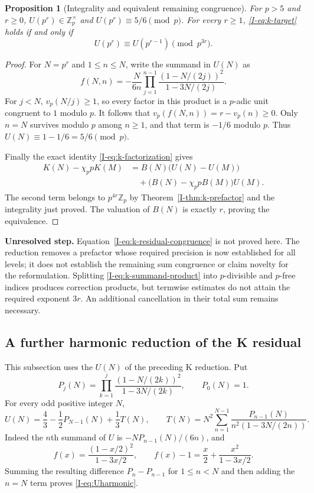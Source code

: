 \documentclass[11pt,letterpaper]{article}
\newtheorem{proposition}[theorem]{Proposition}
\numberwithin{equation}{section}
\begin{document}
\begin{proposition}[Integrality and equivalent remaining congruence]
\label{I-prop:k-equivalence}
For $p>5$ and $r\ge0$, $U(p^r)\in\mathbb Z_p^\times$ and
$U(p^r)\equiv5/6\pmod p$. For every $r\ge1$, \eqref{I-eq:k-target}
holds if and only if
\begin{equation}\label{I-eq:k-residual-congruence}
 \boxed{\quad U(p^r)\equiv U(p^{r-1})\pmod{p^{3r}}.\quad}
\end{equation}
\end{proposition}
\begin{proof}
For $N=p^r$ and $1\le n\le N$, write the summand in $U(N)$ as
\begin{equation}\label{I-eq:k-summand-product}
 f(N,n)=-\frac{N}{6n}
 \prod_{j=1}^{n-1}
 \frac{(1-N/(2j))^2}{1-3N/(2j)}.
\end{equation}
For $j<N$, $v_p(N/j)\ge1$, so every factor in this product is a
$p$-adic unit congruent to $1$ modulo $p$. It follows that
$v_p(f(N,n))=r-v_p(n)\ge0$. Only $n=N$ survives modulo $p$ among
$n\ge1$, and that term is $-1/6$ modulo $p$. Thus
$U(N)\equiv1-1/6=5/6\pmod p$.

Finally the exact identity \eqref{I-eq:k-factorization} gives
\begin{align*}
 K(N)-\chi_p pK(M)
 &=B(N)\bigl(U(N)-U(M)\bigr)\\
 &\quad+\bigl(B(N)-\chi_p pB(M)\bigr)U(M).
\end{align*}
The second term belongs to $p^{4r}\mathbb Z_p$ by
Theorem~\ref{I-thm:k-prefactor} and the integrality just proved.
The valuation of $B(N)$ is exactly $r$, proving the equivalence.
\end{proof}

\noindent\textbf{Unresolved step.}
Equation~\eqref{I-eq:k-residual-congruence} is not proved here. The reduction removes a prefactor whose required precision is now established for all levels; it does not establish the remaining sum congruence or claim novelty for the reformulation. Splitting \eqref{I-eq:k-summand-product} into $p$-divisible and $p$-free indices produces correction products, but termwise estimates do not attain the required exponent $3r$. An additional cancellation in their total sum remains necessary.
\subsection{A further harmonic reduction of the K residual}
This subsection uses the $U(N)$ of the preceding K reduction. Put
\[
 P_j(N)=\prod_{k=1}^j\frac{(1-N/(2k))^2}{1-3N/(2k)},\qquad P_0(N)=1.
\]
For every odd positive integer $N$,
\begin{equation}\label{I-eq:Uharmonic}
 U(N)=\frac43-\frac12P_{N-1}(N)+\frac13T(N),\qquad
 T(N)=N^2\sum_{n=1}^{N-1}\frac{P_{n-1}(N)}{n^2(1-3N/(2n))}.
\end{equation}
Indeed the $n$th summand of $U$ is $-NP_{n-1}(N)/(6n)$, and
\[
 f(x)=\frac{(1-x/2)^2}{1-3x/2},\qquad
 f(x)-1=\frac{x}{2}+\frac{x^2}{1-3x/2}.
\]
Summing the resulting difference $P_n-P_{n-1}$ for $1\le n<N$
and then adding the $n=N$ term proves \eqref{I-eq:Uharmonic}.
\end{document}
